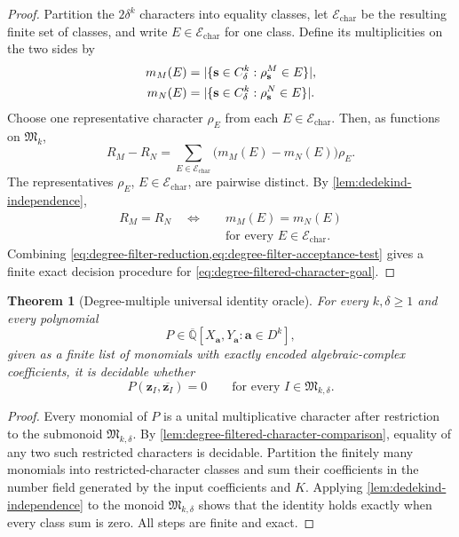 \documentclass[11pt]{article}
\theoremstyle{plain}
\newtheorem{theorem}{Theorem}[section]
\theoremstyle{definition}
\theoremstyle{remark}
\newcommand{\AlgNums}{\overline{\mathbb Q}}
\newcommand{\zvec}[1]{\mathbf z_{#1}}
\newcommand{\InstMonoid}[1]{\mathfrak M_{#1}}
\DeclarePairedDelimiter{\abs}{\lvert}{\rvert}
\begin{document}
\begin{proof}
Partition the $2\delta^k$ characters into equality classes, let
$\mathcal E_{\mathrm{char}}$
be the resulting finite set of classes, and write
$E\in\mathcal E_{\mathrm{char}}$ for one class.  Define its multiplicities
on the two sides by
\begin{equation*}
\begin{aligned}
  m_M(E)&=\abs{\{\mathbf s\in C_\delta^k:
                    \rho^M_{\mathbf s}\in E\}},\\
  m_N(E)&=\abs{\{\mathbf s\in C_\delta^k:
                    \rho^N_{\mathbf s}\in E\}}.
\end{aligned}
\end{equation*}
Choose one representative character $\rho_E$ from each
$E\in\mathcal E_{\mathrm{char}}$.
Then, as functions on $\InstMonoid{k}$,
\begin{equation*}
  R_M-R_N
  =\sum_{E\in\mathcal E_{\mathrm{char}}}
     \bigl(m_M(E)-m_N(E)\bigr)\rho_E.
\end{equation*}
The representatives $\rho_E$, $E\in\mathcal E_{\mathrm{char}}$, are
pairwise distinct.  By
\cref{lem:dedekind-independence},
\begin{equation}
\begin{aligned}
  R_M=R_N
  \quad\Longleftrightarrow\quad&
  m_M(E)=m_N(E)\\[-2pt]
  &\text{for every }E\in\mathcal E_{\mathrm{char}}.
\end{aligned}
  \label{eq:degree-filter-acceptance-test}
\end{equation}
Combining
\cref{eq:degree-filter-reduction,eq:degree-filter-acceptance-test}
gives a finite exact decision procedure
for \eqref{eq:degree-filtered-character-goal}.
\end{proof}

\begin{theorem}[Degree-multiple universal identity oracle]
\label{thm:degree-multiple-universal-identity}
For every $k,\delta\ge1$ and every polynomial
\[
  P\in\AlgNums[X_{\mathbf a},Y_{\mathbf a}:\mathbf a\in D^k],
\]
given as a finite list of monomials with exactly encoded algebraic-complex
coefficients, it is decidable whether
\[
  P(\zvec I,\overline{\zvec I})=0
  \qquad\text{for every }I\in\mathfrak M_{k,\delta}.
\]
\end{theorem}

\begin{proof}
Every monomial of $P$ is a unital multiplicative character after restriction
to the submonoid $\mathfrak M_{k,\delta}$.  By
\cref{lem:degree-filtered-character-comparison}, equality of any two such
restricted characters is decidable.  Partition the finitely many monomials
into restricted-character classes and sum their coefficients in the number
field generated by the input coefficients and $K$.  Applying
\cref{lem:dedekind-independence} to the monoid $\mathfrak M_{k,\delta}$ shows
that the identity
holds exactly when every class sum is zero.  All steps are finite and exact.
\end{proof}
\end{document}

